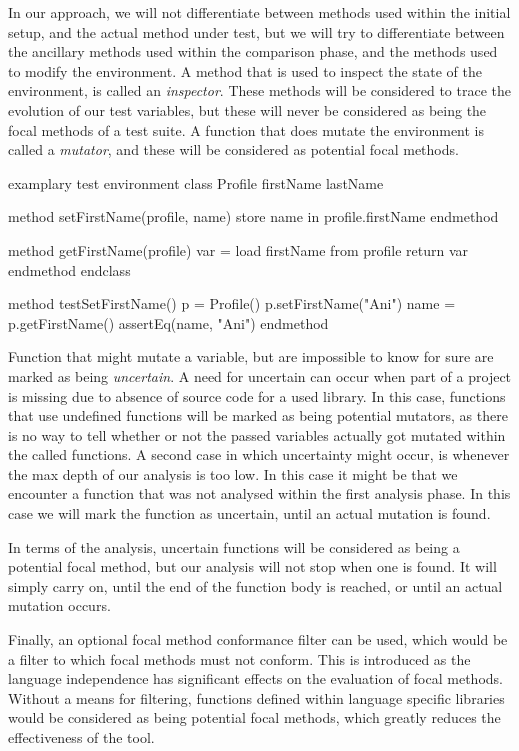 \documentclass[11pt]{article}
\begin{document}
\begin{multicols}{2}
In our approach, we will not differentiate between methods used within the initial setup, and the actual method under test, but we will try to differentiate between the ancillary methods used within the comparison phase, and the methods used to modify the environment. A method that is used to inspect the state of the environment, is called an \textit{inspector}. These methods will be considered to trace the evolution of our test variables, but these will never be considered as being the focal methods of a test suite. A function that does mutate the environment is called a \textit{mutator}, and these will be considered as potential focal methods. 

\begin{sexylisting}{examplary test environment\label{lst:example1}}
class Profile
  firstName
  lastName
	
  method setFirstName(profile, name)
    store name in profile.firstName
  endmethod
	
  method getFirstName(profile)
    var = load firstName from profile
    return var
  endmethod
endclass
	
method testSetFirstName()
  p = Profile()
  p.setFirstName("Ani")
  name = p.getFirstName()
  assertEq(name, "Ani")
endmethod
\end{sexylisting}


Function that might mutate a variable, but are impossible to know for sure are marked as being \textit{uncertain}. A need for uncertain can occur when part of a project is missing due to absence of source code for a used library. In this case, functions that use undefined functions will be marked as being potential mutators, as there is no way to tell whether or not the passed variables actually got mutated within the called functions. A second case in which uncertainty might occur, is whenever the max depth of our analysis is too low. In this case it might be that we encounter a function that was not analysed within the first analysis phase. In this case we will mark the function as uncertain, until an actual mutation is found.

In terms of the analysis, uncertain functions will be considered as being a potential focal method, but our analysis will not stop when one is found. It will simply carry on, until the end of the function body is reached, or until an actual mutation occurs.

Finally, an optional focal method conformance filter can be used, which would be a filter to which focal methods must not conform. This is introduced as the language independence has significant effects on the evaluation of focal methods. Without a means for filtering, functions defined within language specific libraries would be considered as being potential focal methods, which greatly reduces the effectiveness of the tool.


\end{multicols}
\end{document}
